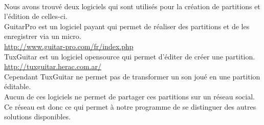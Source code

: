 \newpage
\paragraph{}
	Nous avons trouvé deux logiciels qui sont utilisés pour la création de partitions et l'édition de celles-ci. \\
	GuitarPro est un logiciel payant qui permet de réaliser des partitions et de les enregistrer via un micro. \\
	\url{http://www.guitar-pro.com/fr/index.php} \\
	TuxGuitar est un logiciel opensource qui permet d'éditer de créer une partition. \\
	\url{http://tuxguitar.herac.com.ar/}\\
	Cependant TuxGuitar ne permet pas de transformer un son joué en une partition éditable.\\
	Aucun de ces logiciels ne permet de partager ces partitions sur un réseau social.\\ 
	Ce réseau est donc ce qui permet à notre programme de se distinguer des autres solutions disponibles.\\
